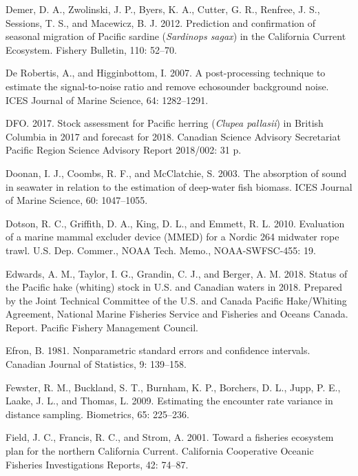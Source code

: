 \documentclass[]{article}
\begin{document}
\leavevmode\hypertarget{ref-Demer2012}{}%
Demer, D. A., Zwolinski, J. P., Byers, K. A., Cutter, G. R., Renfree, J. S., Sessions, T. S., and Macewicz, B. J. 2012. Prediction and confirmation of seasonal migration of Pacific sardine (\emph{Sardinops sagax}) in the California Current Ecosystem. Fishery Bulletin, 110: 52--70.

\leavevmode\hypertarget{ref-DeRobertis2007}{}%
De Robertis, A., and Higginbottom, I. 2007. A post-processing technique to estimate the signal-to-noise ratio and remove echosounder background noise. ICES Journal of Marine Science, 64: 1282--1291.

\leavevmode\hypertarget{ref-DFO2017}{}%
DFO. 2017. Stock assessment for Pacific herring (\emph{Clupea pallasii}) in British Columbia in 2017 and forecast for 2018. Canadian Science Advisory Secretariat Pacific Region Science Advisory Report 2018/002: 31 p.

\leavevmode\hypertarget{ref-Doonan2003}{}%
Doonan, I. J., Coombs, R. F., and McClatchie, S. 2003. The absorption of sound in seawater in relation to the estimation of deep-water fish biomass. ICES Journal of Marine Science, 60: 1047--1055.

\leavevmode\hypertarget{ref-Dotson2010}{}%
Dotson, R. C., Griffith, D. A., King, D. L., and Emmett, R. L. 2010. Evaluation of a marine mammal excluder device (MMED) for a Nordic 264 midwater rope trawl. U.S. Dep. Commer., NOAA Tech. Memo., NOAA-SWFSC-455: 19.

\leavevmode\hypertarget{ref-Edwards2018}{}%
Edwards, A. M., Taylor, I. G., Grandin, C. J., and Berger, A. M. 2018. Status of the Pacific hake (whiting) stock in U.S. and Canadian waters in 2018. Prepared by the Joint Technical Committee of the U.S. and Canada Pacific Hake/Whiting Agreement, National Marine Fisheries Service and Fisheries and Oceans Canada. Report. Pacific Fishery Management Council.

\leavevmode\hypertarget{ref-Efron1981}{}%
Efron, B. 1981. Nonparametric standard errors and confidence intervals. Canadian Journal of Statistics, 9: 139--158.

\leavevmode\hypertarget{ref-Fewster2009}{}%
Fewster, R. M., Buckland, S. T., Burnham, K. P., Borchers, D. L., Jupp, P. E., Laake, J. L., and Thomas, L. 2009. Estimating the encounter rate variance in distance sampling. Biometrics, 65: 225--236.

\leavevmode\hypertarget{ref-Field2001}{}%
Field, J. C., Francis, R. C., and Strom, A. 2001. Toward a fisheries ecosystem plan for the northern California Current. California Cooperative Oceanic Fisheries Investigations Reports, 42: 74--87.
\end{document}
